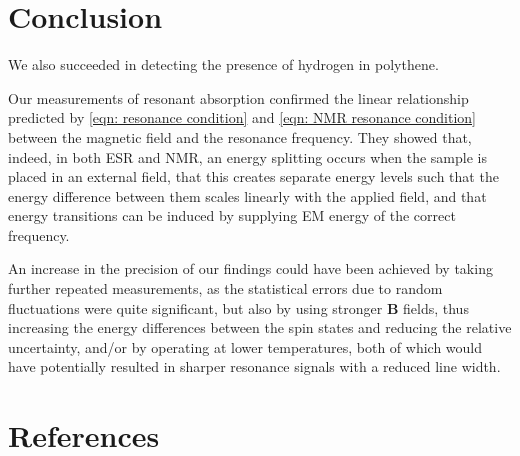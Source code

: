 \documentclass[a4paper]{jpconf}
\numberwithin{equation}{section}
\begin{document}
\section{Conclusion}

We also succeeded in detecting the presence of hydrogen in polythene.

Our measurements of resonant absorption confirmed the linear relationship predicted by \eqref{eqn: resonance condition} and \eqref{eqn: NMR resonance condition} between the magnetic field and the resonance frequency. They showed that, indeed, in both ESR and NMR, an energy splitting occurs when the sample is placed in an external field, that this creates separate energy levels such that the energy difference between them scales linearly with the applied field, and that energy transitions can be induced by supplying EM energy of the correct frequency. 

An increase in the precision of our findings could have been achieved by taking further repeated measurements, as the statistical errors due to random fluctuations were quite significant, but also by using stronger $\mathbf{B}$ fields, thus increasing the energy differences between the spin states and reducing the relative uncertainty, and/or by operating at lower temperatures, both of which would have potentially resulted in sharper resonance signals with a reduced line width.

\section*{References}
\begin{thebibliography}{9}
\end{thebibliography}
\end{document}
